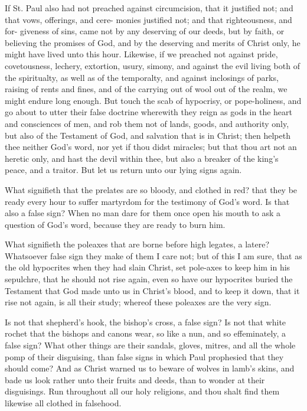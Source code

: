 \documentclass{custom}
\begin{document}
If St. Paul also had not preached against circumcision, 
that it justified not; and that vows, offerings, and cere- 
monies justified not; and that righteousness, and for- 
giveness of sins, came not by any deserving of our deeds, 
but by faith, or believing the promises of God, and by the 
deserving and merits of Christ only, he might have lived 
unto this hour. Likewise, if we preached not against 
pride, covetousness, lechery, extortion, usury, simony, 
and against the evil living both of the spiritualty, as well 
as of the temporalty, and against inclosings of parks, 
raising of rents and fines, and of the carrying out of wool 
out of the realm, we might endure long enough. But 
touch the scab of hypocrisy, or pope-holiness, and go 
about to utter their false doctrine wherewith they reign as 
gods in the heart and consciences of men, and rob them 
not of lands, goods, and authority only, but also of the 
Testament of God, and salvation that is in Christ; then 
helpeth thee neither God's word, nor yet if thou didst 
miracles; but that thou art not an heretic only, and hast 
the devil within thee, but also a breaker of the king's 
peace, and a traitor. But let us return unto our lying 
signs again. 

What signifieth that the prelates are so bloody, and 
clothed in red? that they be ready every hour to suffer 
martyrdom for the testimony of God's word. Is that also 
a false sign? When no man dare for them once open 
his mouth to ask a question of God's word, because they 
are ready to burn him. 

What signifieth the poleaxes that are borne before 
high legates, a latere? Whatsoever false sign they make of 
them I care not; but of this I am sure, that as the old 
hypocrites when they had slain Christ, set pole-axes to 
keep him in his sepulchre, that he should not rise again, 
even so have our hypocrites buried the Testament that 
God made unto us in Christ's blood, and to keep it 
down, that it rise not again, is all their study; whereof 
these poleaxes are the very sign. 

Is not that shepherd's hook, the bishop's cross, a false 
sign? Is not that white rochet that the bishops and 
canons wear, so like a nun, and so effeminately, a false 
sign? What other things are their sandals, gloves, mitres, 
and all the whole pomp of their disguising, than false signs 
in which Paul prophesied that they should come? And 
as Christ warned us to beware of wolves in lamb's skins,
and bade us look rather unto their fruits and deeds, than
to wonder at their disguisings. Run throughout all our
holy religions, and thou shalt find them likewise all 
clothed in falsehood. 
\end{document}
